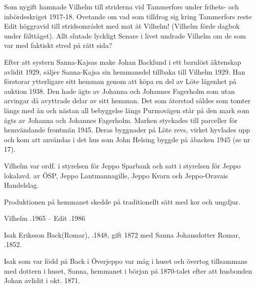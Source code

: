 Som nygift hamnade Vilhelm till striderna vid Tammerfors under frihets- och inbördeskriget 1917-18. Ovetande om vad som tilldrog sig kring Tammerfors reste Edit höggravid till stridsområdet med mat åt Vilhelm! (Vilhelm förde dagbok under fälttåget). Allt slutade lyckligt Senare i livet undrade Vilhelm om de som var med faktiskt stred på rätt sida?

Efter att systern Sanna-Kajsas make Johan Backlund i ett barnlöst äktenskap avlidit 1929, säljer Sanna-Kajsa sin hemmansdel tillbaka till Vilhelm 1929. Han förstorar ytterligare sitt hemman genom att köpa en del av Löte lägenhet på auktion 1938. Den hade ägts av Johanna och Johannes Fagerholm som utan arvingar då  avyttrade  delar av sitt hemman. Det som återstod såldes som tomter längs med ån och nästan all bebyggelse längs Purmovägen står på den mark som ägts av Johanna och Johannes Fagerholm. Marken styckades till parceller för hemvändande frontmän 1945. Deras byggnader på Löte revs, virket hyvlades upp och kom att användas i det hus som John Helsing byggde på åbacken 1945 (se nr 17).

Vilhelm var ordf. i styrelsen för Jeppo Sparbank och satt i styrelsen för Jeppo lokalavd. av ÖSP, Jeppo Lantmannagille, Jeppo Kvarn och Jeppo-Oravais Handelslag.
\begin{jhchildren}
  \item {}
  \item {}
  \item {}
  \item {}
\end{jhchildren}
Produktionen på hemmanet skedde på traditionellt sätt med kor och ungdjur.

Vilhelm .1965  --  Edit .1986


Isak Eriksson Back(Romar), .1848, gift 1872 med Sanna Johansdotter Romar, .1852.
\begin{jhchildren}
  \item {}
  \item {}
  \item {}
  \item {}
  \item {}
  \item {}
  \item {}
\end{jhchildren}
Isak som var född på Back i Överjeppo var måg i huset och övertog tillsammans med dottern i huset, Sanna, hemmanet i början på 1870-talet efter att husbonden Johan avlidit i okt. 1871.

